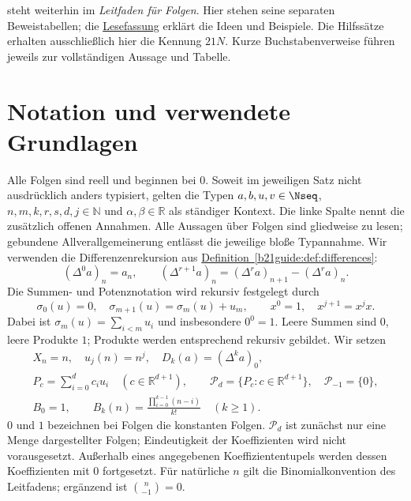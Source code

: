 \Nguide{} steht weiterhin im \emph{Leitfaden für Folgen}.
Hier stehen seine separaten Beweistabellen; die
\href{_B21-newton-reading.pdf\#newton.reading}{Lesefassung}
erklärt die Ideen und Beispiele. Die Hilfssätze erhalten ausschließlich
hier die Kennung $21N$. Kurze Buchstabenverweise führen jeweils zur
vollständigen Aussage und Tabelle.

\section*{Notation und verwendete Grundlagen}
Alle Folgen sind reell und beginnen bei $0$.
Soweit im jeweiligen Satz nicht ausdrücklich anders typisiert, gelten die Typen $a,b,u,v\in\Nseq$, $n,m,k,r,s,d,j\in\mathbb N$
und $\alpha,\beta\in\mathbb R$ als ständiger Kontext.
Die linke Spalte nennt die zusätzlich offenen Annahmen.
Alle Aussagen über Folgen sind gliedweise zu lesen; gebundene
Allverallgemeinerung entlässt die jeweilige bloße Typannahme.
Wir verwenden die Differenzenrekursion aus
\hyperref[b21guide:def:differences]{Definition~\ref*{b21guide:def:differences}}:
\[
 (\Delta^0a)_n=a_n,\qquad
 (\Delta^{r+1}a)_n=(\Delta^ra)_{n+1}-(\Delta^ra)_n.
\]
Die Summen- und Potenznotation wird rekursiv festgelegt durch
\[
 \sigma_0(u)=0,\quad \sigma_{m+1}(u)=\sigma_m(u)+u_m,
 \qquad x^0=1,\quad x^{j+1}=x^jx.
\]
Dabei ist $\sigma_m(u)=\sum_{i<m}u_i$ und insbesondere $0^0=1$.
Leere Summen sind $0$, leere Produkte $1$; Produkte werden entsprechend
rekursiv gebildet. Wir setzen
\[
 \begin{gathered}
 X_n=n,\quad u_j(n)=n^j,\quad D_k(a)=(\Delta^ka)_0,\\
 P_c=\sum_{i=0}^d c_i u_i\quad(c\in\mathbb R^{d+1}),\qquad
 \mathcal P_d=\{P_c:c\in\mathbb R^{d+1}\},\quad\mathcal P_{-1}=\{0\},\\
 B_0=1,\qquad B_k(n)=\frac{\prod_{i=0}^{k-1}(n-i)}{k!}\quad(k\geq1).
 \end{gathered}
\]
$0$ und $1$ bezeichnen bei Folgen die konstanten Folgen.
$\mathcal P_d$ ist zunächst nur eine Menge dargestellter Folgen;
Eindeutigkeit der Koeffizienten wird nicht vorausgesetzt.
Außerhalb eines angegebenen Koeffiziententupels werden dessen
Koeffizienten mit $0$ fortgesetzt. Für natürliche $n$ gilt die
Binomialkonvention des Leitfadens; ergänzend ist $\binom n{-1}=0$.


